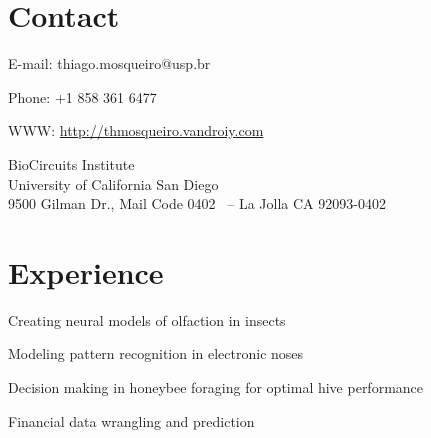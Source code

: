 \documentclass[letterpaper]{resume} %
\begin{document}
\begin{minipage}[t]{0.64\textwidth} %


  \section{Contact}

  {\color{black}
  \fontsize{11pt}{11pt}
  { E-mail:} { thiago.mosqueiro@usp.br}}

  \vspace{0.1cm}
  { Phone:} { +1 858 361 6477}

  \vspace{0.1cm}
  { WWW:} \href{http://thmosqueiro.vandroiy.com}{{  http://thmosqueiro.vandroiy.com}}

  \vspace{0.3cm}
  BioCircuits Institute\\
  University of California San Diego\\
  9500 Gilman Dr., Mail Code 0402 \ -- La Jolla CA 92093-0402



  \section{Experience}



  \vspace{-0.4cm}
  \vspace{\topsep} %
  \begin{tightitemize}
  \item Creating neural models of olfaction in insects
  \item Modeling pattern recognition in electronic noses
  \item Decision making in honeybee foraging for optimal hive performance
  \item Financial data wrangling and prediction
  \end{tightitemize}


\end{minipage}
\end{document}
